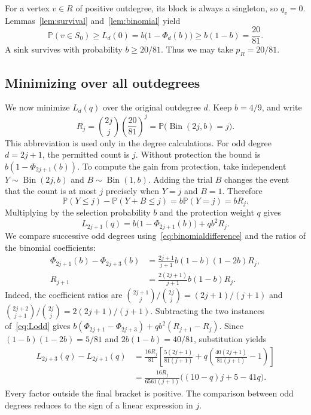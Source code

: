 \documentclass[12pt]{article}
\DeclareMathOperator{\Bin}{Bin}
\newcommand{\Pp}{\mathbb P}
\begin{document}
For a vertex \(v\in R\) of positive outdegree, its block is always a singleton, so \(q_v=0\). Lemmas~\ref{lem:survival} and~\ref{lem:binomial} yield
\[
\Pp(v\in S_0)\ge L_d(0)
=b\bigl(1-\Phi_d(b)\bigr)\ge b(1-b)=\frac{20}{81}.
\]
A sink survives with probability \(b\ge20/81\). Thus we may take \(p_R=20/81\).

\subsection{Minimizing over all outdegrees}\label{sec:degreemin}
We now minimize \(L_d(q)\) over the original outdegree \(d\). Keep \(b=4/9\), and write
\[
R_j=\binom{2j}{j}\left(\frac{20}{81}\right)^j
=\Pp\bigl(\Bin(2j,b)=j\bigr).
\]
This abbreviation is used only in the degree calculations. For odd degree \(d=2j+1\), the permitted count is \(j\). Without protection the bound is \(b(1-\Phi_{2j+1}(b))\). To compute the gain from protection, take independent \(Y\sim\Bin(2j,b)\) and \(B\sim\Bin(1,b)\). Adding the trial \(B\) changes the event that the count is at most \(j\) precisely when \(Y=j\) and \(B=1\). Therefore
\[
\Pp(Y\le j)-\Pp(Y+B\le j)=b\Pp(Y=j)=bR_j.
\]
Multiplying by the selection probability \(b\) and the protection weight \(q\) gives
\begin{equation}\label{eq:Lodd}
L_{2j+1}(q)=b\bigl(1-\Phi_{2j+1}(b)\bigr)+qb^2R_j.
\end{equation}
We compare successive odd degrees using~\eqref{eq:binomialdifference} and the ratios of the binomial coefficients:
\[
\begin{aligned}
\Phi_{2j+1}(b)-\Phi_{2j+3}(b)
&=\frac{2j+1}{j+1}b(1-b)(1-2b)R_j,\\
R_{j+1}&=\frac{2(2j+1)}{j+1}b(1-b)R_j.
\end{aligned}
\]
Indeed, the coefficient ratios are \(\binom{2j+1}{j}/\binom{2j}{j}=(2j+1)/(j+1)\) and \(\binom{2j+2}{j+1}/\binom{2j}{j}=2(2j+1)/(j+1)\). Subtracting the two instances of~\eqref{eq:Lodd} gives
\(b(\Phi_{2j+1}-\Phi_{2j+3})+qb^2(R_{j+1}-R_j)\).
Since \((1-b)(1-2b)=5/81\) and \(2b(1-b)=40/81\), substitution yields
\begin{equation}\label{eq:recurrence}
\begin{aligned}
L_{2j+3}(q)-L_{2j+1}(q)
&=\frac{16R_j}{81}\left[\frac{5(2j+1)}{81(j+1)}
+q\left(\frac{40(2j+1)}{81(j+1)}-1\right)\right]\\
&=\frac{16R_j}{6561(j+1)}\bigl((10-q)j+5-41q\bigr).
\end{aligned}
\end{equation}
Every factor outside the final bracket is positive. The comparison between odd degrees reduces to the sign of a linear expression in \(j\).
\end{document}
